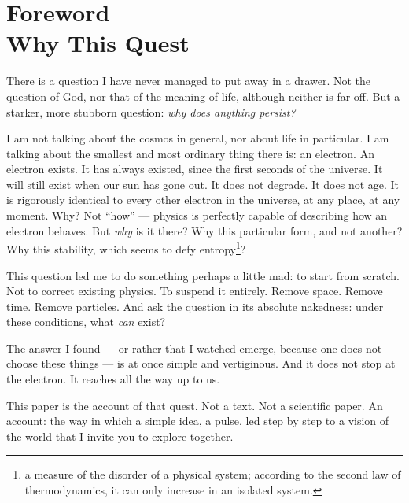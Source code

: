 \documentclass[11pt, a4paper, openright]{book}
\begin{document}
\frontmatter
\tableofcontents
\newpage

\mainmatter

\chapter*{Foreword \\ Why This Quest}

There is a question I have never managed to put away in a drawer. Not the question of God, nor that of the meaning of life, although neither is far off. But a starker, more stubborn question: \emph{why does anything persist?}

\medskip

I am not talking about the cosmos in general, nor about life in particular. I am talking about the smallest and most ordinary thing there is: an electron. An electron exists. It has always existed, since the first seconds of the universe. It will still exist when our sun has gone out. It does not degrade. It does not age. It is rigorously identical to every other electron in the universe, at any place, at any moment. Why? Not ``how'' --- physics is perfectly capable of describing how an electron behaves. But \emph{why} is it there? Why this particular form, and not another? Why this stability, which seems to defy entropy\footnote{a measure of the disorder of a physical system; according to the second law of thermodynamics, it can only increase in an isolated system.}?

\medskip

This question led me to do something perhaps a little mad: to start from scratch. Not to correct existing physics. To suspend it entirely. Remove space. Remove time. Remove particles. And ask the question in its absolute nakedness: under these conditions, what \emph{can} exist?

\medskip

The answer I found --- or rather that I watched emerge, because one does not choose these things --- is at once simple and vertiginous. And it does not stop at the electron. It reaches all the way up to us.

\medskip

This paper is the account of that quest. Not a text. Not a scientific paper. An account: the way in which a simple idea, a pulse, led step by step to a vision of the world that I invite you to explore together.
\end{document}
